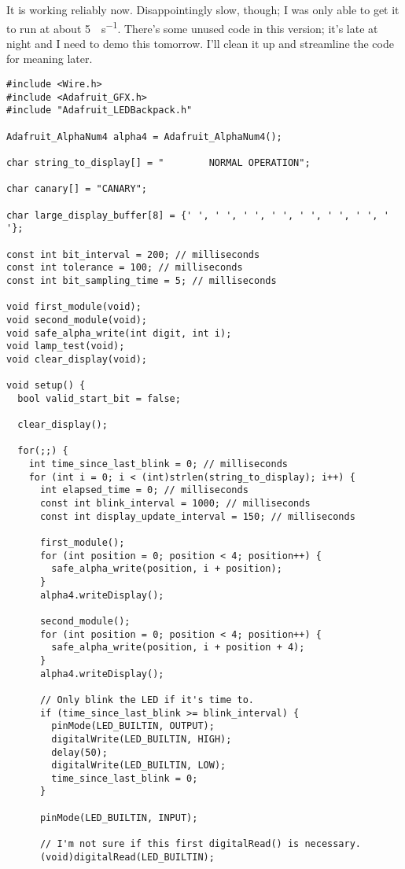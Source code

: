 \documentclass[a4paper,notitlepage]{article}
\begin{document}
It is working reliably now. Disappointingly slow, though; I was only able to
get it to run at about \SI{5}{\bit\per\second}. There's some unused code in
this version; it's late at night and I need to demo this tomorrow. I'll clean
it up and streamline the code for meaning later.
\begin{verbatim}
#include <Wire.h>
#include <Adafruit_GFX.h>
#include "Adafruit_LEDBackpack.h"

Adafruit_AlphaNum4 alpha4 = Adafruit_AlphaNum4();

char string_to_display[] = "        NORMAL OPERATION";

char canary[] = "CANARY";

char large_display_buffer[8] = {' ', ' ', ' ', ' ', ' ', ' ', ' ', ' '};

const int bit_interval = 200; // milliseconds
const int tolerance = 100; // milliseconds
const int bit_sampling_time = 5; // milliseconds

void first_module(void);
void second_module(void);
void safe_alpha_write(int digit, int i);
void lamp_test(void);
void clear_display(void);

void setup() {
  bool valid_start_bit = false;

  clear_display();

  for(;;) {
    int time_since_last_blink = 0; // milliseconds
    for (int i = 0; i < (int)strlen(string_to_display); i++) {
      int elapsed_time = 0; // milliseconds
      const int blink_interval = 1000; // milliseconds
      const int display_update_interval = 150; // milliseconds

      first_module();
      for (int position = 0; position < 4; position++) {
        safe_alpha_write(position, i + position);
      }
      alpha4.writeDisplay();

      second_module();
      for (int position = 0; position < 4; position++) {
        safe_alpha_write(position, i + position + 4);
      }
      alpha4.writeDisplay();

      // Only blink the LED if it's time to.
      if (time_since_last_blink >= blink_interval) {
        pinMode(LED_BUILTIN, OUTPUT);
        digitalWrite(LED_BUILTIN, HIGH);
        delay(50);
        digitalWrite(LED_BUILTIN, LOW);
        time_since_last_blink = 0;
      }

      pinMode(LED_BUILTIN, INPUT);

      // I'm not sure if this first digitalRead() is necessary.
      (void)digitalRead(LED_BUILTIN);


\end{verbatim}
\end{document}
